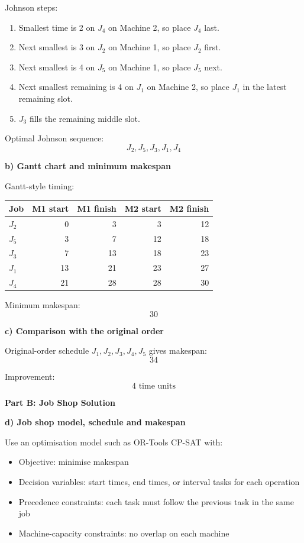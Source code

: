 \documentclass[11pt,a4paper]{article}
\begin{document}
Johnson steps:
\begin{enumerate}
\item Smallest time is 2 on $J_4$ on Machine 2, so place $J_4$ last.
\item Next smallest is 3 on $J_2$ on Machine 1, so place $J_2$ first.
\item Next smallest is 4 on $J_5$ on Machine 1, so place $J_5$ next.
\item Next smallest remaining is 4 on $J_1$ on Machine 2, so place $J_1$ in the latest remaining slot.
\item $J_3$ fills the remaining middle slot.
\end{enumerate}

Optimal Johnson sequence:
\[
J_2, J_5, J_3, J_1, J_4
\]

\textbf{b) Gantt chart and minimum makespan}

Gantt-style timing:

\begin{center}
\begin{tabular}{lrrrr}
\toprule
Job & M1 start & M1 finish & M2 start & M2 finish \\
\midrule
$J_2$ & 0  & 3  & 3  & 12 \\
$J_5$ & 3  & 7  & 12 & 18 \\
$J_3$ & 7  & 13 & 18 & 23 \\
$J_1$ & 13 & 21 & 23 & 27 \\
$J_4$ & 21 & 28 & 28 & 30 \\
\bottomrule
\end{tabular}
\end{center}

Minimum makespan:
\[
30
\]

\textbf{c) Comparison with the original order}

Original-order schedule $J_1, J_2, J_3, J_4, J_5$ gives makespan:
\[
34
\]

Improvement:
\[
4 \text{ time units}
\]

\textbf{Part B: Job Shop Solution}

\textbf{d) Job shop model, schedule and makespan}

Use an optimisation model such as OR-Tools CP-SAT with:
\begin{itemize}
\item Objective: minimise makespan
\item Decision variables: start times, end times, or interval tasks for each operation
\item Precedence constraints: each task must follow the previous task in the same job
\item Machine-capacity constraints: no overlap on each machine
\end{itemize}
\end{document}

